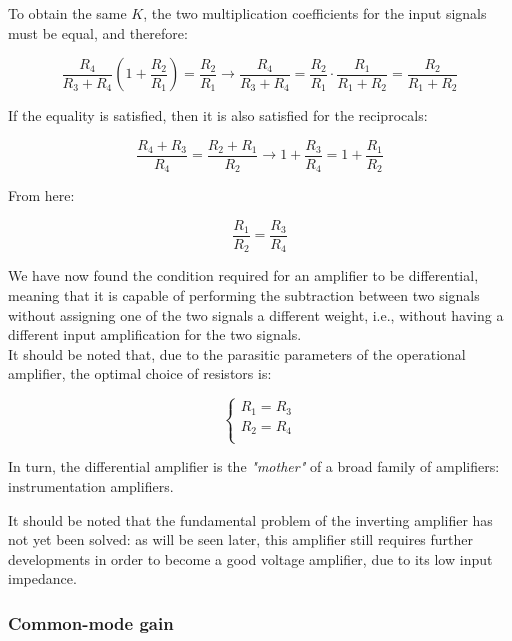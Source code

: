 \documentclass[../main.tex]{subfiles}
\begin{document}
To obtain the same $K$, the two multiplication coefficients for the input signals must be equal, and therefore:

\begin{equation}
	\frac{R_4}{R_3 + R_4} \left( 1 + \frac{R_2}{R_1} \right) = \frac{R_2}{R_1} \rightarrow \frac{R_4}{R_3 + R_4} = \frac{R_2}{R_1} \cdot \frac{R_1}{R_1 + R_2} = \frac{R_2}{R_1 + R_2}
\end{equation}

If the equality is satisfied, then it is also satisfied for the reciprocals:

\begin{equation}
	\frac{R_4 + R_3}{R_4} = \frac{R_2 + R_1}{R_2} \rightarrow 1 + \frac{R_3}{R_4} = 1 + \frac{R_1}{R_2}
\end{equation}

From here:

\begin{equation}
	\frac{R_1}{R_2} = \frac{R_3}{R_4}
\end{equation}


We have now found the condition required for an amplifier to be differential, meaning that it is capable of performing the subtraction between two signals without assigning one of the two signals a different weight, i.e., without having a different input amplification for the two signals.\\

It should be noted that, due to the parasitic parameters of the operational amplifier, the optimal choice of resistors is:

\begin{equation}
\begin{cases}
	R_1 = R_3\\
	R_2 = R_4\\
\end{cases}
\end{equation}


In turn, the differential amplifier is the \textit{"mother"} of a broad family of amplifiers: instrumentation amplifiers. 

It should be noted that the fundamental problem of the inverting amplifier has not yet been solved: as will be seen later, this amplifier still requires further developments in order to become a good voltage amplifier, due to its low input impedance.



\subsubsection*{Common-mode gain}
\end{document}
